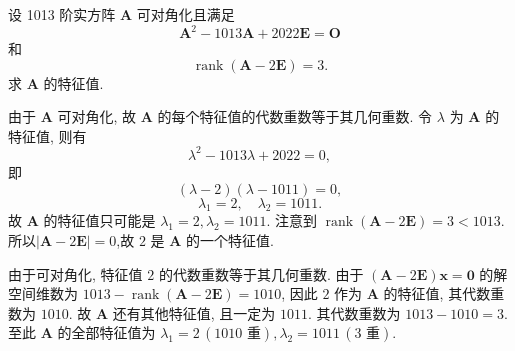 \documentclass[../../main.tex]{subfiles}
\begin{document}
\begin{example}
设 1013 阶实方阵 \(\boldsymbol{A}\) 可对角化且满足
\[
\boldsymbol{A}^2 - 1013\boldsymbol{A} + 2022\boldsymbol{E} = \boldsymbol{O}
\]
和
\[
\operatorname{rank}(\boldsymbol{A} - 2\boldsymbol{E}) = 3.
\]
求 \(\boldsymbol{A}\) 的特征值.
\end{example}
\begin{solution}
由于 \(\boldsymbol{A}\) 可对角化, 故 \(\boldsymbol{A}\) 的每个特征值的代数重数等于其几何重数. 令 \(\lambda\) 为 \(\boldsymbol{A}\) 的特征值, 则有
\[
\lambda^2 - 1013\lambda + 2022 = 0,
\]
即
\[
(\lambda - 2)(\lambda - 1011) = 0,
\]
\[
\lambda_1 = 2, \quad \lambda_2 = 1011.
\]
故 \(\boldsymbol{A}\) 的特征值只可能是 \(\lambda_1 = 2, \lambda_2 = 1011\). 注意到 \(\operatorname{rank}(\boldsymbol{A} - 2\boldsymbol{E}) = 3 < 1013\). 所以$|\boldsymbol{A} - 2\boldsymbol{E}|=0$,故 \(2\) 是 \(\boldsymbol{A}\) 的一个特征值.

由于可对角化, 特征值 \(2\) 的代数重数等于其几何重数. 由于 \((\boldsymbol{A} - 2\boldsymbol{E})\boldsymbol{x} = \boldsymbol{0}\) 的解空间维数为 \(1013 - \operatorname{rank}(\boldsymbol{A} - 2\boldsymbol{E}) = 1010\), 因此 \(2\) 作为 \(\boldsymbol{A}\) 的特征值, 其代数重数为 \(1010\). 故 \(\boldsymbol{A}\) 还有其他特征值, 且一定为 \(1011\). 其代数重数为 \(1013 - 1010 = 3\). 至此 \(\boldsymbol{A}\) 的全部特征值为 \(\lambda_1 = 2 \, (1010 \text{ 重}), \lambda_2 = 1011 \, (3 \text{ 重})\).
\end{solution}

\begin{example}

\end{example}
\begin{solution}

\end{solution}

\begin{example}

\end{example}
\begin{solution}

\end{solution}

\begin{example}

\end{example}
\begin{solution}

\end{solution}

\begin{example}

\end{example}
\begin{solution}

\end{solution}
\end{document}
